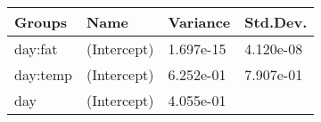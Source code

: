 \documentclass[12pt,]{article}
\begin{document}
\begin{longtable}[]{@{}llll@{}}
\toprule
\begin{minipage}[b]{0.11\columnwidth}\raggedright
Groups\strut
\end{minipage} & \begin{minipage}[b]{0.15\columnwidth}\raggedright
Name\strut
\end{minipage} & \begin{minipage}[b]{0.12\columnwidth}\raggedright
Variance\strut
\end{minipage} & \begin{minipage}[b]{0.14\columnwidth}\raggedright
Std.Dev.\strut
\end{minipage}\tabularnewline
\midrule
\endhead
\begin{minipage}[t]{0.11\columnwidth}\raggedright
day:fat\strut
\end{minipage} & \begin{minipage}[t]{0.15\columnwidth}\raggedright
(Intercept)\strut
\end{minipage} & \begin{minipage}[t]{0.12\columnwidth}\raggedright
1.697e-15\strut
\end{minipage} & \begin{minipage}[t]{0.14\columnwidth}\raggedright
4.120e-08\strut
\end{minipage}\tabularnewline
\begin{minipage}[t]{0.11\columnwidth}\raggedright
day:temp\strut
\end{minipage} & \begin{minipage}[t]{0.15\columnwidth}\raggedright
(Intercept)\strut
\end{minipage} & \begin{minipage}[t]{0.12\columnwidth}\raggedright
6.252e-01\strut
\end{minipage} & \begin{minipage}[t]{0.14\columnwidth}\raggedright
7.907e-01\strut
\end{minipage}\tabularnewline
\begin{minipage}[t]{0.11\columnwidth}\raggedright
day\strut
\end{minipage} & \begin{minipage}[t]{0.15\columnwidth}\raggedright
(Intercept)\strut
\end{minipage} & \begin{minipage}[t]{0.12\columnwidth}\raggedright
4.055e-01\strut
\end{minipage} & \begin{minipage}[t]{0.14\columnwidth}\raggedright

\end{minipage}
\end{longtable}
\end{document}
